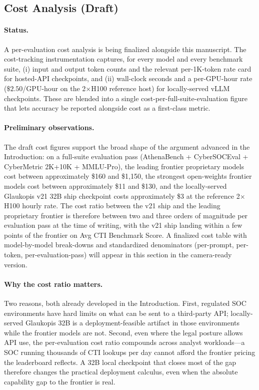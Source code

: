 \documentclass[unnumsec,webpdf,contemporary,large]{oup-authoring-template}
\theoremstyle{thmstyleone}
\theoremstyle{thmstyletwo}
\theoremstyle{thmstylethree}
\begin{document}
\subsection{Cost Analysis (Draft)}
\label{sec:results-cost}

\paragraph{Status.}
A per-evaluation cost analysis is being finalized alongside this manuscript. The cost-tracking instrumentation captures, for every model and every benchmark suite, (i) input and output token counts and the relevant per-1K-token rate card for hosted-API checkpoints, and (ii) wall-clock seconds and a per-GPU-hour rate ($\$2.50$/GPU-hour on the 2$\times$H100 reference host) for locally-served vLLM checkpoints. These are blended into a single cost-per-full-suite-evaluation figure that lets accuracy be reported alongside cost as a first-class metric.

\paragraph{Preliminary observations.}
The draft cost figures support the broad shape of the argument advanced in the Introduction: on a full-suite evaluation pass (AthenaBench + CyberSOCEval + CyberMetric 2K+10K + MMLU-Pro), the leading frontier proprietary models cost between approximately \$160 and \$1{,}150, the strongest open-weights frontier models cost between approximately \$11 and \$130, and the locally-served Glaukopis v21 32B ship checkpoint costs approximately \$3 at the reference 2$\times$H100 hourly rate. The cost ratio between the v21 ship and the leading proprietary frontier is therefore between two and three orders of magnitude per evaluation pass at the time of writing, with the v21 ship landing within a few points of the frontier on Avg CTI Benchmark Score. A finalized cost table with model-by-model break-downs and standardized denominators (per-prompt, per-token, per-evaluation-pass) will appear in this section in the camera-ready version.

\paragraph{Why the cost ratio matters.}
Two reasons, both already developed in the Introduction. First, regulated SOC environments have hard limits on what can be sent to a third-party API; locally-served Glaukopis 32B is a deployment-feasible artifact in those environments while the frontier models are not. Second, even where the legal posture allows API use, the per-evaluation cost ratio compounds across analyst workloads---a SOC running thousands of CTI lookups per day cannot afford the frontier pricing the leaderboard reflects. A 32B local checkpoint that closes most of the gap therefore changes the practical deployment calculus, even when the absolute capability gap to the frontier is real.
\end{document}
